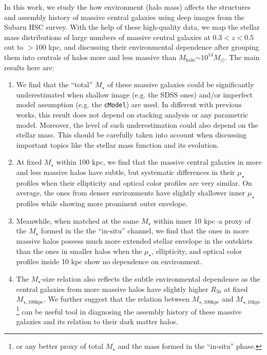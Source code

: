 \documentclass[a4paper,fleqn,usenatbib]{mnras}
\def\mstar{{$M_{\star}$}}
\def\mhalo{{$M_{\mathrm{halo}}$}}
\def\minn{{$M_{\star,10\mathrm{kpc}}$}}
\def\mtot{{$M_{\star,100\mathrm{kpc}}$}}
\def\mden{{$\mu_{\star}$}}
\begin{document}
    In this work, we study the how environment (halo mass) affects the structures and
    assembly history of massive central galaxies using deep images from the Subaru HSC 
    survey.
    With the help of these high-quality data, we map the stellar mass distributions of 
    large numbers of massive central galaxies at $0.3 < z < 0.5$ out to $>100$ kpc, 
    and discussing their environmental dependence after grouping them into centrals of 
    halos more and less massive than \mhalo{}$\sim 10^{14} M_{\odot}$. 
    The main results here are:
    
    \begin{enumerate}
        \item We find that the ``total'' \mstar{} of these massive galaxies could be 
            significantly underestimated when shallow image (e.g. the SDSS ones) 
            and/or imperfect model assumption (e.g. the \texttt{cModel}) are used.
            In different with previous works, this result does not depend on stacking 
            analysis or any parametric model. 
            Moreover, the level of such underestimation could also depend on the 
            stellar mass. 
            This should be carefully taken into account when discussing important 
            topics like the stellar mass function and its evolution.
        \item At fixed \mstar{} within 100 kpc, we find that the massive central 
            galaxies in more and less massive halos have subtle, but systematic 
            differences in their \mden{} profiles when their ellipticity and optical 
            color profiles are very similar. 
            On average, the ones from denser environments have slightly shallower 
            inner \mden{} profiles while showing more prominent outer envelope.
        \item Meanwhile, when matched at the same \mstar{} within inner 10 kpc--a 
            proxy of the \mstar{} formed in the the ``in-situ'' channel, we find 
            that the ones in more massive halos possess much more extended stellar 
            envelope in the outskirts than the ones in smaller halos when the 
            \mden{}, ellipticity, and optical color profiles inside 10 kpc show 
            no dependence on environment. 
        \item The \mstar{}-size relation also reflects the subtle environmental 
            dependence as the central galaxies from more massive halos have 
            slightly higher $R_{\mathrm{50}}$ at fixed \mtot{}. 
            We further suggest that the relation between \mtot{} and 
            \minn{}\footnote{or any better proxy of total \mstar{} and the mass 
            formed in the ``in-situ'' phase.} can be useful tool in diagnosing the
            assembly history of these massive galaxies and its relation to their 
            dark matter halos.
    \end{enumerate}
\end{document}
